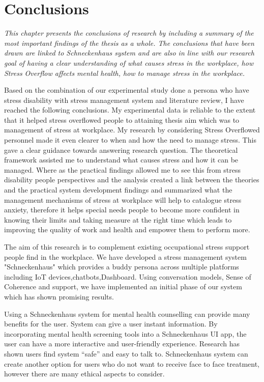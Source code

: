 \chapter{Conclusions}
\textit{This chapter presents the conclusions of research by including a summary of the most important findings of the thesis as a whole. The conclusions that have been drawn are linked to Schneckenhaus system and are also in line with our research goal of having a clear understanding of what causes stress in the workplace, how Stress Overflow affects mental health, how to manage stress in the workplace.}
\vspace{5mm}

Based on the combination of our experimental study done a persona who have stress disability with stress management system and literature review, I have reached the following conclusions. My experimental data is reliable to the extent that it helped stress overflowed people to attaining thesis aim which was to management of stress at workplace. My research by considering  Stress Overflowed personnel  made it even clearer to  when and how the need to manage stress. This gave a clear guidance towards answering research question. The theoretical framework assisted me to understand what causes stress and how it can be managed. Where as the practical findings allowed me to see this from stress disability people perspectives and the analysis created a link between the theories and the practical system development findings and summarized what the management mechanisms of stress at workplace will help to catalogue stress anxiety, therefore it helps special needs people to become more confident in knowing their limits and taking measure at the right time which leads to improving the quality of work and health and empower them to perform more.

The aim of this research is to complement existing occupational stress support people find in the workplace. We have developed a stress management system "Schneckenhaus" which provides a buddy persona across multiple platforms including IoT devices,chatbots,Dashboard. Using conversation models, Sense of Coherence and support, we have implemented an initial phase of our system which has shown promising results.

Using a Schneckenhaus system for mental health counselling can provide many benefits for the user. System can give a user instant information. By incorporating mental health screening tools into a Schneckenhaus \acf{UI} app, the user can have a more interactive and user-friendly experience. Research has shown users find system “safe” and easy to talk to. Schneckenhaus system can create another option for users who do not want to receive face to face treatment, however there are many ethical aspects to consider.
 
